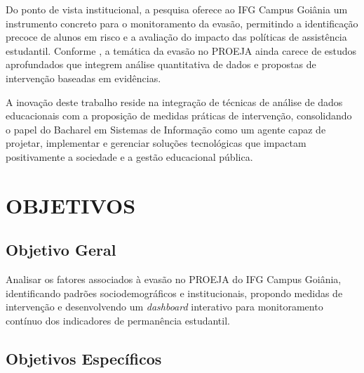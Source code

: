 \documentclass[12pt,a4paper]{article}
\begin{document}
Do ponto de vista institucional, a pesquisa oferece ao IFG Campus Goiânia um instrumento concreto para o monitoramento da evasão, permitindo a identificação precoce de alunos em risco e a avaliação do impacto das políticas de assistência estudantil. Conforme , a temática da evasão no PROEJA ainda carece de estudos aprofundados que integrem análise quantitativa de dados e propostas de intervenção baseadas em evidências.

A inovação deste trabalho reside na integração de técnicas de análise de dados educacionais com a proposição de medidas práticas de intervenção, consolidando o papel do Bacharel em Sistemas de Informação como um agente capaz de projetar, implementar e gerenciar soluções tecnológicas que impactam positivamente a sociedade e a gestão educacional pública.

\section{OBJETIVOS}

\subsection{Objetivo Geral}

Analisar os fatores associados à evasão no PROEJA do IFG Campus Goiânia, identificando padrões sociodemográficos e institucionais, propondo medidas de intervenção e desenvolvendo um \textit{dashboard} interativo para monitoramento contínuo dos indicadores de permanência estudantil.

\subsection{Objetivos Específicos}
\end{document}
